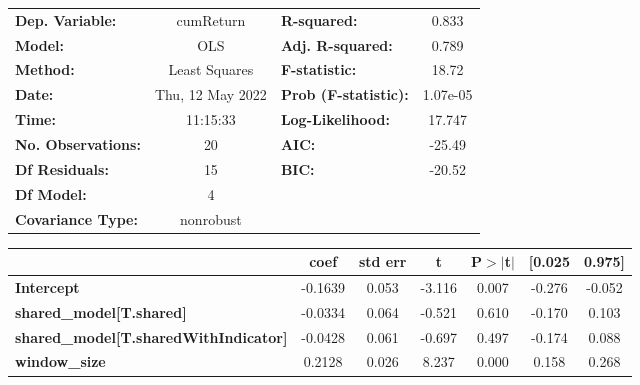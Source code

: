 \begin{center}
\begin{tabular}{lclc}
\toprule
\textbf{Dep. Variable:}                       &    cumReturn     & \textbf{  R-squared:         } &     0.833   \\
\textbf{Model:}                               &       OLS        & \textbf{  Adj. R-squared:    } &     0.789   \\
\textbf{Method:}                              &  Least Squares   & \textbf{  F-statistic:       } &     18.72   \\
\textbf{Date:}                                & Thu, 12 May 2022 & \textbf{  Prob (F-statistic):} &  1.07e-05   \\
\textbf{Time:}                                &     11:15:33     & \textbf{  Log-Likelihood:    } &    17.747   \\
\textbf{No. Observations:}                    &          20      & \textbf{  AIC:               } &    -25.49   \\
\textbf{Df Residuals:}                        &          15      & \textbf{  BIC:               } &    -20.52   \\
\textbf{Df Model:}                            &           4      & \textbf{                     } &             \\
\textbf{Covariance Type:}                     &    nonrobust     & \textbf{                     } &             \\
\bottomrule
\end{tabular}
\begin{tabular}{lcccccc}
                                              & \textbf{coef} & \textbf{std err} & \textbf{t} & \textbf{P$> |$t$|$} & \textbf{[0.025} & \textbf{0.975]}  \\
\midrule
\textbf{Intercept}                            &      -0.1639  &        0.053     &    -3.116  &         0.007        &       -0.276    &       -0.052     \\
\textbf{shared\_model[T.shared]}              &      -0.0334  &        0.064     &    -0.521  &         0.610        &       -0.170    &        0.103     \\
\textbf{shared\_model[T.sharedWithIndicator]} &      -0.0428  &        0.061     &    -0.697  &         0.497        &       -0.174    &        0.088     \\
\textbf{window\_size}                         &       0.2128  &        0.026     &     8.237  &         0.000        &        0.158    &        0.268     \\

\end{tabular}
\end{center}

